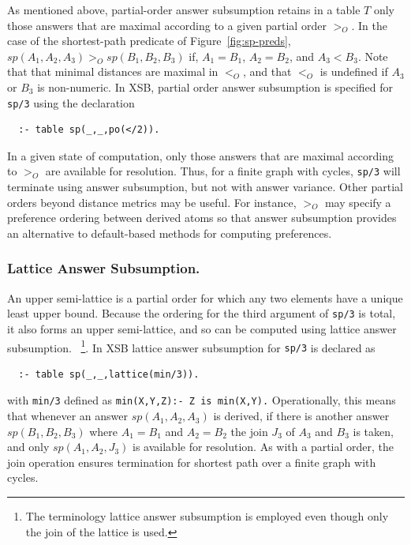 As mentioned above, partial-order answer subsumption retains in a
table $T$ only those answers that are maximal according to a given
partial order $>_O$.  In the case of the shortest-path predicate of
Figure~\ref{fig:sp-preds}, $sp(A_1,A_2,A_3) >_O sp(B_1,B_2,B_3)$ if,
$A_1 = B_1$, $A_2 = B_2$, and $A_3 < B_3$.  Note that that minimal
distances are maximal in $<_O$, and that $<_O$ is undefined if $A_3$
or $B_3$ is non-numeric.  In XSB, partial order answer subsumption
is specified for {\tt sp/3} using the declaration
%
{\small
\begin{verbatim}
  :- table sp(_,_,po(</2)).
\end{verbatim}
}
%
\noindent
In a given state of computation, only those answers that are maximal
according to $>_O$ are available for resolution.  Thus, for a finite
graph with cycles, {\tt sp/3} will terminate using answer subsumption,
but not with answer variance.  Other partial orders beyond distance
metrics may be useful.  For instance, $>_O$ may specify a preference
ordering between derived atoms so that answer subsumption provides an
alternative to default-based methods for computing preferences.

\subsubsection{Lattice Answer Subsumption.}
An upper semi-lattice is a partial order for which any two elements
have a unique least upper bound.  Because the ordering for the third
argument of {\tt sp/3} is total, it also forms an upper semi-lattice,
and so can be computed using lattice answer subsumption.
~\footnote{The terminology lattice answer subsumption is employed even
  though only the join of the lattice is used.}.  In XSB lattice
answer subsumption for {\tt sp/3} is declared as
%
{\small
\begin{verbatim}
  :- table sp(_,_,lattice(min/3)).
\end{verbatim}
}
%
\noindent
with {\tt min/3} defined as {\tt min(X,Y,Z):- Z is min(X,Y).} 
Operationally, this means that whenever an answer
$sp(A_1,A_2,A_3)$ is derived, if there is another answer
$sp(B_1,B_2,B_3)$ where $A_1 = B_1$ and $A_2 = B_2$ the join $J_3$ of
$A_3$ and $B_3$ is taken, and only $sp(A_1,A_2,J_3)$ is available for
resolution.  As with a partial order, the join operation
ensures termination for shortest path over a finite graph with cycles.

